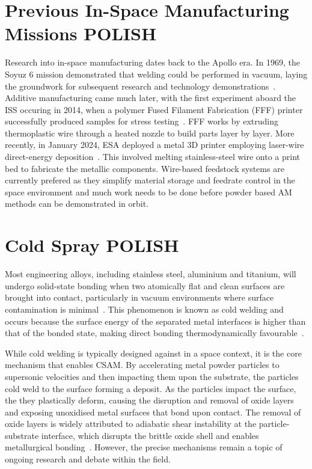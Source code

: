 \section{Previous In-Space Manufacturing Missions POLISH}
Research into in-space manufacturing dates back to the Apollo era. In 1969, the Soyuz 6 mission demonstrated that welding could be performed in vacuum, laying the groundwork for subsequent research and technology demonstrations~\cite{nasa1984welding}. Additive manufacturing came much later, with the first experiment aboard the ISS occuring in 2014, when a polymer Fused Filament Fabrication (FFF) printer successfully produced samples for stress testing~\cite{Prater2019}. FFF works by extruding thermoplastic wire through a heated nozzle to build parts layer by layer. More recently, in January 2024, ESA deployed a metal 3D printer employing laser-wire direct-energy deposition~\cite{ESA2024Metal3DPrinter}. This involved melting stainless-steel wire onto a print bed to fabricate the metallic components. Wire-based feedstock systems are currently prefered as they simplify material storage and feedrate control in the space environment and much work needs to be done before powder based AM methods can be demonstrated in orbit.

\section{Cold Spray POLISH}
Most engineering alloys, including stainless steel, aluminium and titanium, will undergo solid-state bonding when two atomically flat and clean surfaces are brought into contact, particularly in vacuum environments where surface contamination is minimal~\cite{merstallinger2009coldwelding}. 
This phenomenon is known as cold welding and occurs because the surface energy of the separated metal interfaces is higher than that of the bonded state, making direct bonding thermodynamically favourable~\cite{WagleBaker2015}. 

While cold welding is typically designed against in a space context, it is the core mechanism that enables CSAM. By accelerating metal powder particles to supersonic velocities and then impacting them upon the substrate, the particles cold weld to the surface forming a deposit. As the particles impact the surface, the they plastically deform, causing the disruption and removal of oxide layers and exposing unoxidised metal surfaces that bond upon contact. The removal of oxide layers is widely attributed to adiabatic shear instability at the particle-substrate interface, which disrupts the brittle oxide shell and enables metallurgical bonding~\cite{assadi2016cold}. However, the precise mechanisms remain a topic of ongoing research and debate within the field.

